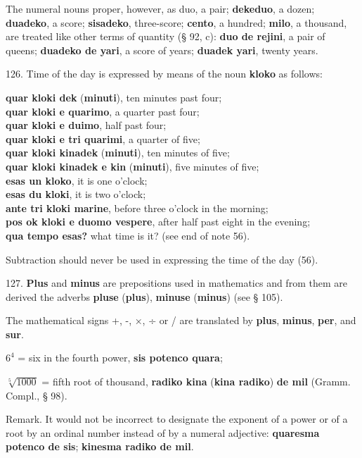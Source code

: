 The numeral nouns proper, however, as duo, a pair; \textbf{dekeduo}, a dozen; \textbf{duadeko}, a score; \textbf{sisadeko}, three-score; \textbf{cento}, a hundred; \textbf{milo}, a thousand, are treated like other terms of quantity (§ 92, c): \textbf{duo de rejini}, a pair of queens; \textbf{duadeko de yari}, a score of years; \textbf{duadek yari}, twenty years.

126. Time of the day is expressed by means of the noun \textbf{kloko} as follows:

\textbf{quar kloki dek }(\textbf{minuti}), ten minutes past four; \\
\textbf{quar kloki e quarimo}, a quarter past four; \\
\textbf{quar kloki e duimo}, half past four; \\
\textbf{quar kloki e tri quarimi}, a quarter of five; \\
\textbf{quar kloki kinadek }(\textbf{minuti}), ten minutes of five; \\
\textbf{quar kloki kinadek e kin }(\textbf{minuti}), five minutes of five; \\
\textbf{esas un kloko}, it is one o'clock; \\
\textbf{esas du kloki}, it is two o'clock; \\
\textbf{ante tri kloki marine}, before three o'clock in the morning; \\
\textbf{pos ok kloki e duomo vespere}, after half past eight in the evening; \\
\textbf{qua tempo esas?} what time is it? (see end of note 56).

Subtraction should never be used in expressing the time of the day (56).

127. \textbf{Plus} and \textbf{minus} are prepositions used in mathematics and from them are derived the adverbs \textbf{pluse} (\textbf{plus}), \textbf{minuse} (\textbf{minus}) (see § 105).

The mathematical signs +, -, ×, ÷ or / are translated by \textbf{plus}, \textbf{minus}, \textbf{per}, and \textbf{sur}.

$6^4$ = six in the fourth power, \textbf{sis potenco quara};

$\sqrt[5]{1000}$ = fifth root of thousand, \textbf{radiko kina }(\textbf{kina radiko})\textbf{ de mil} (Gramm. Compl., § 98).

\small Remark. It would not be incorrect to designate the exponent of a power or of a root by an ordinal number instead of by a numeral adjective: \textbf{quaresma potenco de sis}; \textbf{kinesma radiko de mil}. \normalsize


